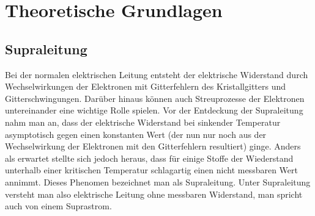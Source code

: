 \documentclass[12pt]{article}
\begin{document}
\section{Theoretische Grundlagen}
\subsection{Supraleitung}
Bei der normalen elektrischen Leitung entsteht der elektrische Widerstand durch Wechselwirkungen der Elektronen mit Gitterfehlern des Kristallgitters und Gitterschwingungen. Darüber hinaus können auch Streuprozesse der Elektronen untereinander eine wichtige Rolle spielen. Vor der  Entdeckung der Supraleitung nahm man an, dass der elektrische Widerstand bei sinkender Temperatur asymptotisch gegen einen konstanten Wert (der nun nur noch aus der Wechselwirkung der Elektronen mit den Gitterfehlern resultiert) ginge. Anders als erwartet stellte sich jedoch heraus, dass für einige Stoffe der Wiederstand unterhalb einer kritischen Temperatur schlagartig einen nicht messbaren Wert annimmt. Dieses Phenomen bezeichnet man als Supraleitung. Unter Supraleitung versteht man also elektrische Leitung ohne messbaren Widerstand, man spricht auch von einem Suprastrom. \\
\end{document}
